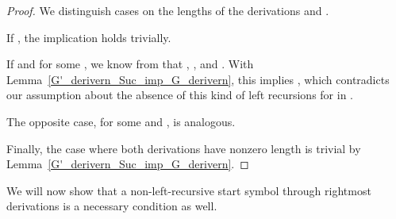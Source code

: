 \begin{isabellebody}
\begin{isamarkuptext}
\begin{lemma}
\begin{proof}
We distinguish cases on the lengths of the derivations  and .

If , the implication holds trivially.

If  and  for some , we know from  that \isa{{\isasymalpha}\ {\isacharequal}{\kern0pt}\ {\isacharbrackleft}{\kern0pt}{\isacharbrackright}{\kern0pt}}, , and 
.
With Lemma~\ref{G'_derivern_Suc_imp_G_derivern}, this implies 
, which contradicts our assumption about
the absence of this kind of left recursions for  in .

The opposite case,  for some  and , is analogous.

Finally, the case where both derivations have nonzero length is trivial by
Lemma~\ref{G'_derivern_Suc_imp_G_derivern}.
\end{proof}
\end{lemma}

We will now show that a non-left-recursive start symbol through rightmost derivations is a necessary
condition as well.


\end{isamarkuptext}
\end{isabellebody}

